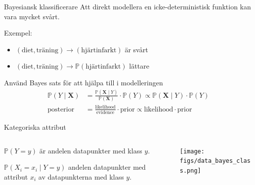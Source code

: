 \documentclass[10pt,english]{beamer}
\begin{document}
\begin{frame}{Bayesiansk klassificerare}
    Att direkt modellera en icke-deterministisk funktion kan vara mycket svårt.

    Exempel:
    \begin{itemize}
        \item $(\text{diet}, \text{träning}) \to (\text{hjärtinfarkt})$ är svårt
        \item $(\text{diet}, \text{träning}) \to \mathbb{P}(\text{hjärtinfarkt})$ lättare
    \end{itemize}

    Använd Bayes sats för att hjälpa till i modelleringen
    \begin{align*}
        \mathbb{P}(Y \mid \mathbf{X}) &= \frac{\mathbb{P}(\mathbf{X} \mid Y)}{\mathbb{P}(\mathbf{X})} \cdot \mathbb{P}(Y) \propto \mathbb{P}(\mathbf{X} \mid Y) \cdot \mathbb{P}(Y) \\
        \text{posterior} &= \frac{\text{likelihood}}{\text{evidence}} \cdot \text{prior} \propto \text{likelihood} \cdot \text{prior}
    \end{align*}
\end{frame}

\begin{frame}{Kategoriska attribut}
    \begin{columns}
        \begin{column}{0.5\textwidth}
            $\mathbb{P}(Y = y)$ är andelen datapunkter med klass $y$.

            $\mathbb{P}(X_i = x_i \mid Y = y)$ andelen datapunkter med attribut $x_i$ av datapunkterna med klass $y$.
        \end{column}
        \begin{column}{0.5\textwidth}
            \texttt{[image: figs/data\_bayes\_class.png]}
        \end{column}
    \end{columns}
\end{frame}
\end{document}
